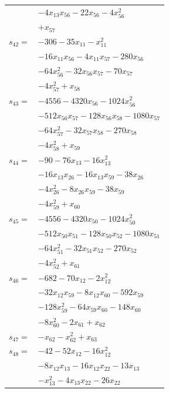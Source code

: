 \begin{longtable}{@{}r@{\;}l@{}}
 & \(\displaystyle -4x_{13}x_{56} -22x_{56} -4x_{56}^{2}\) \\
 & \(\displaystyle +x_{57}\) \\[3pt]
\(s_{42}=\) & \(\displaystyle -306 -35x_{11} -x_{11}^{2}\) \\
 & \(\displaystyle -16x_{11}x_{56} -4x_{11}x_{57} -280x_{56}\) \\
 & \(\displaystyle -64x_{56}^{2} -32x_{56}x_{57} -70x_{57}\) \\
 & \(\displaystyle -4x_{57}^{2} +x_{58}\) \\[3pt]
\(s_{43}=\) & \(\displaystyle -4556 -4320x_{56} -1024x_{56}^{2}\) \\
 & \(\displaystyle -512x_{56}x_{57} -128x_{56}x_{58} -1080x_{57}\) \\
 & \(\displaystyle -64x_{57}^{2} -32x_{57}x_{58} -270x_{58}\) \\
 & \(\displaystyle -4x_{58}^{2} +x_{59}\) \\[3pt]
\(s_{44}=\) & \(\displaystyle -90 -76x_{13} -16x_{13}^{2}\) \\
 & \(\displaystyle -16x_{13}x_{26} -16x_{13}x_{59} -38x_{26}\) \\
 & \(\displaystyle -4x_{26}^{2} -8x_{26}x_{59} -38x_{59}\) \\
 & \(\displaystyle -4x_{59}^{2} +x_{60}\) \\[3pt]
\(s_{45}=\) & \(\displaystyle -4556 -4320x_{50} -1024x_{50}^{2}\) \\
 & \(\displaystyle -512x_{50}x_{51} -128x_{50}x_{52} -1080x_{51}\) \\
 & \(\displaystyle -64x_{51}^{2} -32x_{51}x_{52} -270x_{52}\) \\
 & \(\displaystyle -4x_{52}^{2} +x_{61}\) \\[3pt]
\(s_{46}=\) & \(\displaystyle -682 -70x_{12} -2x_{12}^{2}\) \\
 & \(\displaystyle -32x_{12}x_{59} -8x_{12}x_{60} -592x_{59}\) \\
 & \(\displaystyle -128x_{59}^{2} -64x_{59}x_{60} -148x_{60}\) \\
 & \(\displaystyle -8x_{60}^{2} -2x_{61} +x_{62}\) \\[3pt]
\(s_{47}=\) & \(\displaystyle -x_{62} -x_{62}^{2} +x_{63}\) \\[3pt]
\(s_{48}=\) & \(\displaystyle -42 -52x_{12} -16x_{12}^{2}\) \\
 & \(\displaystyle -8x_{12}x_{13} -16x_{12}x_{22} -13x_{13}\) \\
 & \(\displaystyle -x_{13}^{2} -4x_{13}x_{22} -26x_{22}\) \\

\end{longtable}
